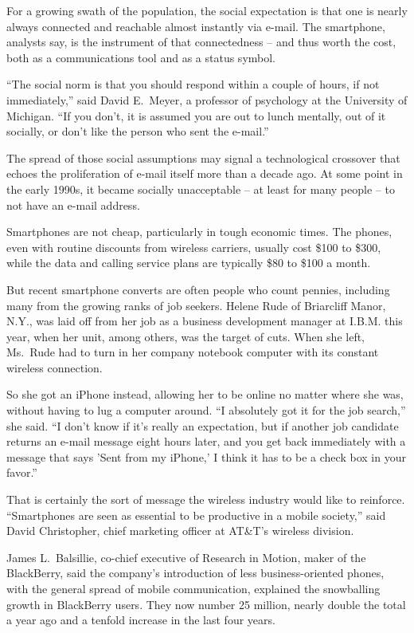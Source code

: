 \documentclass[12pt,a4paper,onecolumn]{article}
\begin{document}
For a growing swath of the population, the social expectation is that one is nearly always connected
and reachable almost instantly via e-mail. The smartphone, analysts say, is the instrument of that
connectedness -- and thus worth the cost, both as a communications tool and as a status symbol.

``The social norm is that you should respond within a couple of hours, if not immediately,'' said
David E.~Meyer, a professor of psychology at the University of Michigan. ``If you don't, it is
assumed you are out to lunch mentally, out of it socially, or don't like the person who sent the
e-mail.''

The spread of those social assumptions may signal a technological crossover that echoes the
proliferation of e-mail itself more than a decade ago. At some point in the early 1990s, it became
socially unacceptable -- at least for many people -- to not have an e-mail address.

Smartphones are not cheap, particularly in tough economic times. The phones, even with routine
discounts from wireless carriers, usually cost \$100 to \$300, while the data and calling service
plans are typically \$80 to \$100 a month.

But recent smartphone converts are often people who count pennies, including many from the growing
ranks of job seekers. Helene Rude of Briarcliff Manor, N.Y., was laid off from her job as a business
development manager at I.B.M. this year, when her unit, among others, was the target of cuts. When
she left, Ms.~Rude had to turn in her company notebook computer with its constant wireless
connection.

So she got an iPhone instead, allowing her to be online no matter where she was, without having to
lug a computer around. ``I absolutely got it for the job search,'' she said. ``I don't know if it's
really an expectation, but if another job candidate returns an e-mail message eight hours later, and
you get back immediately with a message that says 'Sent from my iPhone,' I think it has to be a
check box in your favor.''

That is certainly the sort of message the wireless industry would like to reinforce. ``Smartphones
are seen as essential to be productive in a mobile society,'' said David Christopher, chief
marketing officer at AT\&T's wireless division.

James L.~Balsillie, co-chief executive of Research in Motion, maker of the BlackBerry, said the
company's introduction of less business-oriented phones, with the general spread of mobile
communication, explained the snowballing growth in BlackBerry users. They now number 25 million,
nearly double the total a year ago and a tenfold increase in the last four years.
\end{document}
